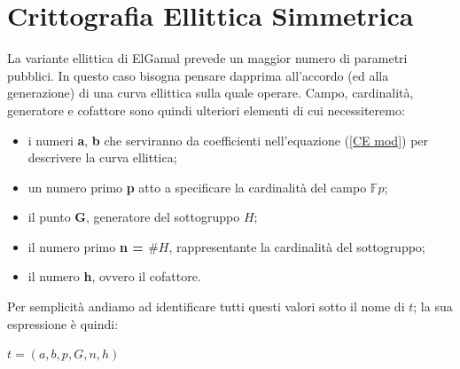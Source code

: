 \documentclass[a4paper,12pt]{tesiinfo}
\begin{document}
\section{Crittografia Ellittica Simmetrica}
La variante ellittica di ElGamal prevede un maggior numero di parametri pubblici. In questo caso bisogna pensare dapprima all'accordo (ed alla generazione) di una curva ellittica sulla quale operare. Campo, cardinalit\`a, generatore e cofattore sono quindi ulteriori elementi di cui necessiteremo:
\begin{itemize}
 \item i numeri \textbf{a}, \textbf{b} che serviranno da coefficienti nell'equazione (\ref{CE mod}) per descrivere la curva ellittica;
 
 \item un numero primo \textbf{p} atto a specificare la cardinalit\`a del campo $\mathbb{F}p$;
 
 \item il punto \textbf{G}, generatore del sottogruppo $H$;
 
 \item il numero primo \textbf{n = $\#H$}, rappresentante la cardinalit\`a del sottogruppo;
 
 \item il numero \textbf{h}, ovvero il cofattore.
\end{itemize}
Per semplicit\`a andiamo ad identificare tutti questi valori sotto il nome di $t$; la sua espressione \`e quindi:
\begin{center}
 $t= (a, b, p, G, n, h)$
\end{center}
\end{document}
